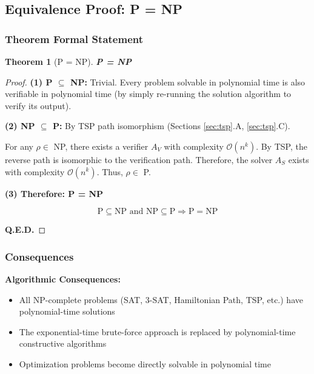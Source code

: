 \documentclass[11pt, letterpaper]{article}
\newtheorem{theorem}{Theorem}[section]
\begin{document}
\subsection{Equivalence Proof: P = NP}

\subsubsection{Theorem Formal Statement}

\begin{theorem}[P = NP]
\textbf{P = NP}
\end{theorem}

\begin{proof}
\textbf{(1) P $\subseteq$ NP:} Trivial. Every problem solvable in polynomial time is also verifiable in polynomial time (by simply re-running the solution algorithm to verify its output).

\textbf{(2) NP $\subseteq$ P:} By TSP path isomorphism (Sections \ref{sec:tsp}.A, \ref{sec:tsp}.C).

For any $\rho \in$ NP, there exists a verifier $A_V$ with complexity $\mathcal{O}(n^k)$.
By TSP, the reverse path is isomorphic to the verification path.
Therefore, the solver $A_S$ exists with complexity $\mathcal{O}(n^k)$.
Thus, $\rho \in$ P.

\textbf{(3) Therefore: P = NP}

\begin{equation}
\text{P} \subseteq \text{NP} \text{ and } \text{NP} \subseteq \text{P} \Rightarrow \text{P} = \text{NP}
\end{equation}

\textbf{Q.E.D.}
\end{proof}

\subsubsection{Consequences}

\textbf{Algorithmic Consequences:}
\begin{itemize}
    \item All NP-complete problems (SAT, 3-SAT, Hamiltonian Path, TSP, etc.) have polynomial-time solutions
    \item The exponential-time brute-force approach is replaced by polynomial-time constructive algorithms
    \item Optimization problems become directly solvable in polynomial time
\end{itemize}
\end{document}
